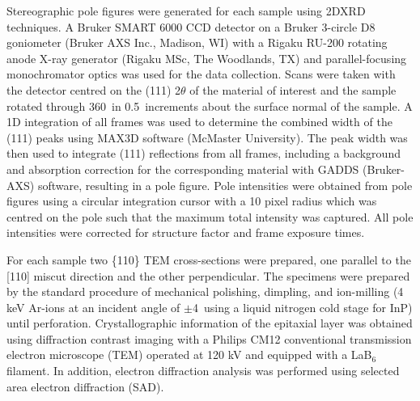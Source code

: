Stereographic pole figures were generated for each sample using 2DXRD techniques.
A Bruker SMART 6000 CCD detector on a Bruker 3-circle D8 goniometer (Bruker AXS Inc., Madison, WI) with a Rigaku RU-200 rotating anode X-ray generator (Rigaku MSc, The Woodlands, TX) and parallel-focusing monochromator optics was used for the data collection.
Scans were taken with the detector centred on the (111) 2\(\theta\) of the material of interest and the sample rotated through 360\degree~in 0.5\degree~increments about the surface normal of the sample.
A 1D integration of all frames was used to determine the combined width of the (111) peaks using MAX3D software (McMaster University)\cite{Britten2007}.
The peak width was then used to integrate (111) reflections from all frames, including a background and absorption correction for the corresponding material with GADDS (Bruker-AXS) software, resulting in a pole figure.
Pole intensities were obtained from pole figures using a circular integration cursor with a 10 pixel radius which was centred on the pole such that the maximum total intensity was captured.
All pole intensities were corrected for structure factor and frame exposure times.

For each sample two \{110\} TEM cross-sections were prepared, one parallel to the [110] miscut direction and the other perpendicular.
The specimens were prepared by the standard procedure of mechanical polishing, dimpling, and ion-milling (4 keV Ar-ions at an incident angle of \(\pm\)4\degree~using a liquid nitrogen cold stage for InP) until perforation.
Crystallographic information of the epitaxial layer was obtained using diffraction contrast imaging with a Philips CM12 conventional transmission electron microscope (TEM) operated at 120 kV and equipped with a LaB\(_6\) filament.
In addition, electron diffraction analysis was performed using selected area electron diffraction (SAD).
